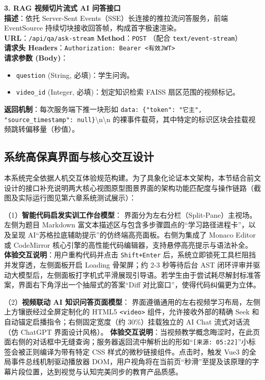 \vspace{1em}
\noindent\textbf{3. RAG 视频切片流式 AI 问答接口}\\
\textbf{描述}：依托 Server-Sent Events（SSE）长连接的推拉流问答服务，前端 EventSource 持续切块接收回答帧，构成首字极速渲染。 \\
\textbf{URL}：\texttt{/api/qa/ask-stream} \quad \textbf{Method}：\texttt{POST} （配合 \texttt{text/event-stream}）\\
\textbf{请求头 Headers}：\texttt{Authorization: Bearer <有效JWT>} \\
\textbf{请求参数 (Body)}：
\begin{itemize}
    \item \texttt{question} (String, 必填)：学生问询。
    \item \texttt{video\_id} (Integer, 必填)：划定知识检索 FAISS 扇区范围的视频标记。
\end{itemize}
\textbf{返回机制}：每次服务端下推一块形如 \texttt{data: \{"token": "它主", "source\_timestamp": null\}}\textbackslash{}n\textbackslash{}n 的裸事件载荷，其中特定的标识区块会挂载视频跳转偏移量（秒值）。

\subsection{系统高保真界面与核心交互设计}

本系统完全依据人机交互体验规范构建。为了具象化论证本文架构，本节结合前文设计的接口补充说明两大核心视图原型图景界面的架构功能匹配度与操作链路（截图及实际运行图见第六章系统测试展示）：

（1）\textbf{智能代码启发实训工作台模型}：
界面分为左右分栏（Split-Pane）主视场。左侧为题目 Markdown 富文本描述区与包含多步骤圆点的“学习路径进程卡”，以及呈现 AI“苏格拉底辅助提示”的仿终端高亮面板。右侧为集成了 Monaco Editor 或 CodeMirror 核心引擎的高性能代码编辑器，支持悬停高亮提示与语法补全。
\textbf{体验交互说明}：用户重构代码并点击 \texttt{Shift+Enter} 后，系统立即锁死工具栏阻挡并发穿透，左侧面板开启 Loading 骨架屏；约 2-3 秒等待后台 AST 闭环评审并驱动大模型后，左侧面板打字机式平滑展现引导语。若学生由于尝试耗尽解封标准答案，界面右下角浮出一个抽屉式的答案“Diff 对比窗口”，使得代码纠偏更为立体。

（2）\textbf{视频联动 AI 知识问答页面模型}：
界面遵循通用的左右视频学习布局，左侧上方镶嵌经过全屏定制化的 HTML5 \texttt{<video>} 组件，允许接收外部的精确 Seek 和自动锚定启播指令；右侧固定宽度（约 30\%）挂载独立的 AI Chat 流式对话流（仿 ChatGPT 界面设计风格）。
\textbf{体验交互说明}：当视频教学概念晦涩时，在此页面右侧的对话框中无缝查询；服务器返回流中解析出的形如“\texttt{[来源: 05:22]}”小标签会被正则编译为带有特定 CSS 样式的微秒链接组件。点击时，触发 Vue3 的全局事件总线机制驱动播放器 DOM，用户视角将在当前页“秒滑”至提及该原理的字幕片段位置，达到视觉与认知完美同步的教育产品质感。

